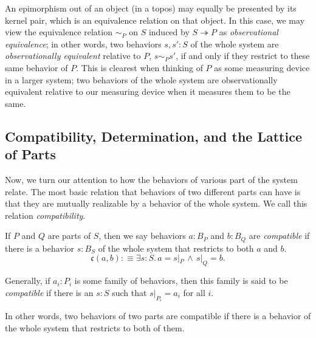 An epimorphism out of an object (in a topos) may equally be presented by its kernel pair, which is an equivalence relation on that object. In this case, we may view the equivalence relation $\sim_P$ on $S$ induced by $S \twoheadrightarrow P$ as \emph{observational equivalence}; in other words, two behaviors $s, s' : S$ of the whole system are \emph{observationally equivalent} relative to $P$, $s \sim_P s'$, if and only if they restrict to these same behavior of $P$. This is clearest when thinking of $P$ as some measuring device in a larger system; two behaviors of the whole system are observationally equivalent relative to our measuring device when it measures them to be the same.

\subsection{Compatibility, Determination, and the Lattice of Parts}

Now, we turn our attention to how the behaviors of various part of the system relate. The most basic relation that behaviors of two different parts can have is that they are mutually realizable by a behavior of the whole system. We call this relation \emph{compatibility}.

\begin{defn}
If $P$ and $Q$ are parts of $S$, then we say behaviors $a : B_P$ and $b : B_Q$ are \emph{compatible} if there is a behavior $s : B_S$ of the whole system that restricts to both $a$ and $b$.
$$\mathfrak{c}(a, b) :\equiv \exists s : S.\, a = s|_P\, \wedge\, s|_Q = b.$$

Generally, if $a_i : P_i$ is some family of behaviors, then this family is said to be \emph{compatible} if there is an $s : S$ such that $s|_{P_i} = a_i$ for all $i$.
\end{defn}

In other words, two behaviors of two parts are compatible if there is a behavior of the whole system that restricts to both of them. 

